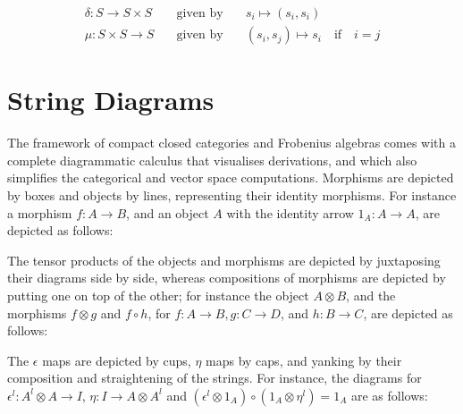 \begin{equation*}\label{eq:frob}
\begin{array}{lll}
\delta \colon S \to S \times S & \quad \mbox{given by} \quad& s_i\mapsto (s_i, s_i)  \\
\mu \colon S \times S \to S &\quad\mbox{given by} \quad& (s_i, s_j) \mapsto  s_i \quad \text{if} \quad i=j
\end{array}
\end{equation*}







\section{String Diagrams} 
\label{string}

The framework of compact closed categories and Frobenius algebras
comes with a complete diagrammatic calculus that visualises
derivations, and which also simplifies the
categorical and vector space computations. Morphisms are depicted by
boxes and objects by lines, representing their identity morphisms. For
instance a morphism $f \colon A \to B$, and an object $A$ with the
identity arrow $1_A \colon A \to A$, are depicted as follows:

\begin{center}
\end{center}

The tensor products of the objects and morphisms are depicted by
juxtaposing their diagrams side by side, whereas compositions of
morphisms are depicted by putting one on top of the other; for instance
the object $A \otimes B$, and the morphisms $f \otimes g$ and $f \circ
h$, for $f \colon A \to B, g \colon C \to D$, and $h \colon B \to C$,
are depicted as follows:

\begin{center}
\end{center}

The $\epsilon$ maps are depicted by cups, $\eta$ maps by caps, and
yanking by their composition and straightening of the strings.  For
instance, the diagrams for $\epsilon^l \colon A^l \otimes A \to I$,
$\eta \colon I \to A\otimes A^l$ and $(\epsilon^l \otimes 1_A) \circ
(1_A \otimes \eta^l) = 1_A$ are as follows:

\begin{center}
  \qquad
\end{center}

